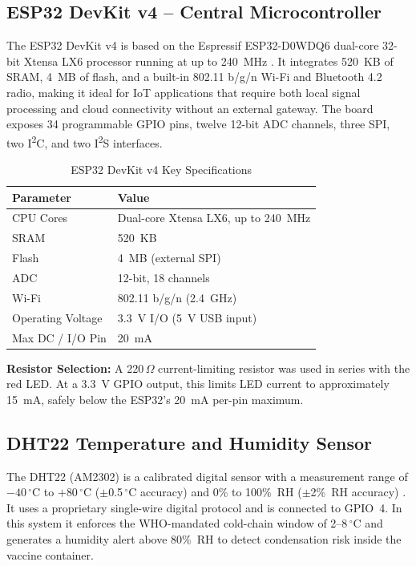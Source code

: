 \documentclass[12pt, a4paper]{article}
\begin{document}
\subsection{ESP32 DevKit v4 -- Central Microcontroller}

The ESP32 DevKit v4 is based on the Espressif ESP32-D0WDQ6 dual-core 32-bit Xtensa LX6 processor running at up to 240~MHz \cite{espressif}. It integrates 520~KB of SRAM, 4~MB of flash, and a built-in 802.11 b/g/n Wi-Fi and Bluetooth 4.2 radio, making it ideal for IoT applications that require both local signal processing and cloud connectivity without an external gateway. The board exposes 34 programmable GPIO pins, twelve 12-bit ADC channels, three SPI, two I\textsuperscript{2}C, and two I\textsuperscript{2}S interfaces.

\begin{table}[H]
\centering
\caption{ESP32 DevKit v4 Key Specifications}
\label{tab:esp32}
\renewcommand{\arraystretch}{1.3}
\begin{tabular}{ll}
\toprule
\textbf{Parameter} & \textbf{Value} \\
\midrule
CPU Cores         & Dual-core Xtensa LX6, up to 240~MHz \\
SRAM              & 520~KB \\
Flash             & 4~MB (external SPI) \\
ADC               & 12-bit, 18 channels \\
Wi-Fi             & 802.11 b/g/n (2.4~GHz) \\
Operating Voltage & 3.3~V I/O (5~V USB input) \\
Max DC / I/O Pin  & 20~mA \\
\bottomrule
\end{tabular}
\end{table}

\noindent\textbf{Resistor Selection:} A 220\,$\Omega$ current-limiting resistor was used in series with the red LED. At a 3.3~V GPIO output, this limits LED current to approximately 15~mA, safely below the ESP32's 20~mA per-pin maximum.

\subsection{DHT22 Temperature and Humidity Sensor}

The DHT22 (AM2302) is a calibrated digital sensor with a measurement range of $-40$\,$^\circ$C to $+80$\,$^\circ$C ($\pm$0.5\,$^\circ$C accuracy) and 0\% to 100\%~RH ($\pm$2\%~RH accuracy) \cite{dht22}. It uses a proprietary single-wire digital protocol and is connected to GPIO~4. In this system it enforces the WHO-mandated cold-chain window of 2--8\,$^\circ$C and generates a humidity alert above 80\%~RH to detect condensation risk inside the vaccine container.
\end{document}
